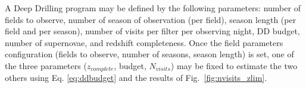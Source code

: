 \documentclass[skiphelvet,twocolumn]{aastex63}
\newcommand{\zcomp}{\mbox{$z_{complete}$}}
\newcommand{\nvisits}{$N_{visits}$}
\begin{document}
A Deep Drilling program may be defined by the following parameters: number of fields to observe, number of season of observation (per field), season length (per field and per season),  number of visits per filter per observing night, DD budget, number of supernovae, and redshift completeness.  Once the field parameters configuration (fields to observe, number of seasons, season length) is set, one of the three parameters (\zcomp, budget, \nvisits) may be fixed to estimate the two others using Eq. \ref{eq:ddbudget} and the results of Fig.~\ref{fig:nvisits_zlim}. 

\end{document}
